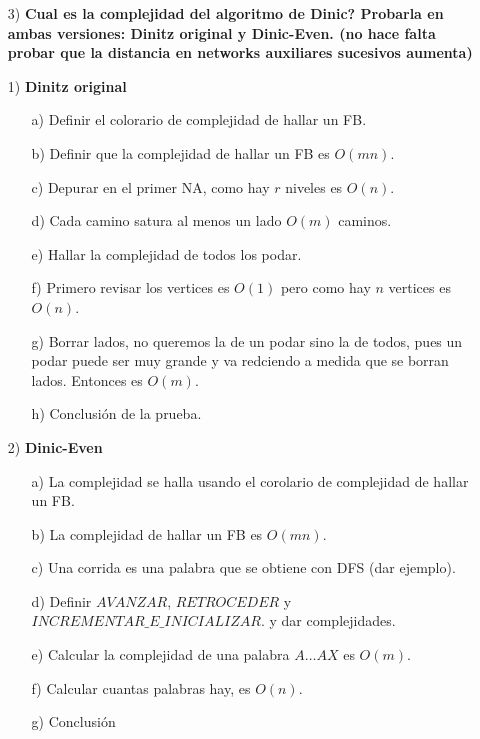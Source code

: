 \documentclass[12pt,a4paper]{article}
\begin{document}
\begin{itemize}
    \item [3)] \textbf{Cual es la complejidad del algoritmo de Dinic? Probarla en ambas 
    versiones: Dinitz original y Dinic-Even. (no hace falta probar que la distancia 
    en networks auxiliares sucesivos aumenta)}
    \label{dem:Dinic}
\end{itemize}
\begin{itemize}
    \item [1)] \textbf{Dinitz original}
    \begin{itemize}
        \item [a)] Definir el colorario de complejidad de hallar un FB.
        \item [b)] Definir que la complejidad de hallar un FB es $O(mn)$.
        \item [c)] Depurar en el primer NA, como hay $r$ niveles es $O(n)$.
        \item [d)] Cada camino satura al menos un lado $O(m)$ caminos.
        \item [e)] Hallar la complejidad de todos los podar.
        \item [f)] Primero revisar los vertices es $O(1)$ pero como hay $n$ 
            vertices es $O(n)$.
        \item [g)] Borrar lados, no queremos la de un podar sino la de todos, 
            pues un podar puede ser muy grande y va redciendo a medida que se 
            borran lados. Entonces es $O(m)$.
        \item [h)] Conclusión de la prueba.
    \end{itemize}
    \item [2)] \textbf{Dinic-Even}
        \begin{itemize}
            \item [a)] La complejidad se halla usando el corolario de complejidad 
                de hallar un FB.
            \item [b)] La complejidad de hallar un FB es $O(mn)$.
            \item [c)] Una corrida es una palabra que se obtiene con DFS (dar ejemplo).
            \item [d)] Definir $AVANZAR$, $RETROCEDER$ y $INCREMENTAR\_E\_INICIALIZAR$.
                y dar complejidades.
            \item [e)] Calcular la complejidad de una palabra $A\ldots AX$ es $O(m)$.
            \item [f)] Calcular cuantas palabras hay, es $O(n)$.
            \item [g)] Conclusión
        \end{itemize}
\end{itemize}
\end{document}
